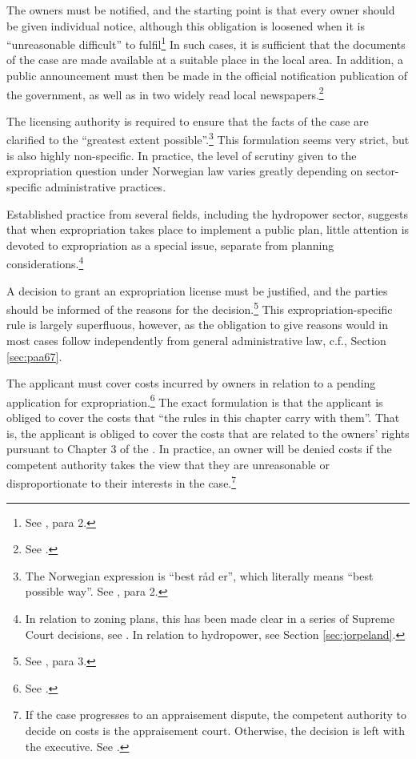 The owners must be notified, and the starting point is that every owner should be given individual notice, although this obligation is loosened when it is ``unreasonable difficult'' to fulfil\footnote{See \cite[12]{ea59}, para 2.} In such cases, it is sufficient that the documents of the case are made available at a suitable place in the local area. In addition, a public announcement must then  be made in the official notification publication of the government, as well as in two widely read local newspapers.\footnote{See \cite[12]{ea59}.}

The licensing authority is required to ensure that the facts of the case are clarified to the ``greatest extent possible''.\footnote{The Norwegian expression is ``best råd er'', which literally means ``best possible way''. See \cite[12]{ea59}, para 2.} This formulation seems very strict, but is also highly non-specific. In practice, the level of scrutiny given to the expropriation question under Norwegian law varies greatly depending on sector-specific administrative practices.  

Established practice from several fields, including the hydropower sector, suggests that when expropriation takes place to implement a public plan, little attention is devoted to expropriation as a special issue, separate from planning considerations.\footnote{In relation to zoning plans, this has been made clear in a series of Supreme Court decisions, see \cite{namsos98,bo99}. In relation to hydropower, see Section \ref{sec:jorpeland}.}

A decision to grant an expropriation license must be justified, and the parties should be informed of the reasons for the decision.\footnote{See \cite[12]{ea59}, para 3.} This expropriation-specific rule is largely superfluous, however, as the obligation to give reasons would in most cases follow independently from general administrative law, c.f., Section \ref{sec:paa67}.

The applicant must cover costs incurred by owners in relation to a pending application for expropriation.\footnote{See \cite[15]{ea59}.} The exact formulation is that the applicant is obliged to cover the costs that ``the rules in this chapter carry with them''. That is, the applicant is obliged to cover the costs that are related to the owners' rights pursuant to Chapter 3 of the \cite{ea59}. In practice, an owner will be denied costs if the competent authority takes the view that they are unreasonable or disproportionate to their interests in the case.\footnote{If the case progresses to an appraisement dispute, the competent authority to decide on costs is the appraisement court. Otherwise, the decision is left with the executive. See \cite[15]{ea59}.}

